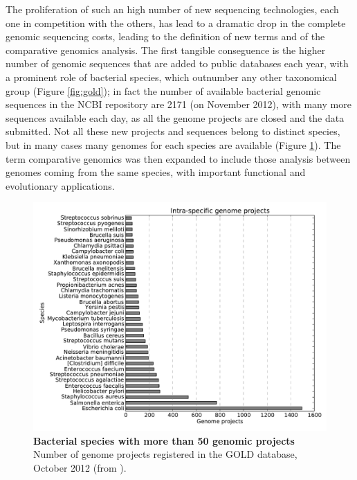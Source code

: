 The proliferation of such an high number of new sequencing technologies, each one in competition with the others, has lead to a dramatic drop in the complete genomic sequencing costs, leading to the definition of new terms and of the comparative genomics analysis. The first tangible conseguence is the higher number of genomic sequences that are added to public databases each year, with a prominent role of bacterial species, which outnumber any other taxonomical group (Figure \ref{fig:gold}); in fact the number of available bacterial genomic sequences in the NCBI repository are 2171 (on November 2012), with many more sequences available each day, as all the genome projects are closed and the data submitted. Not all these new projects and sequences belong to distinct species, but in many cases many genomes for each species are available (Figure \ref{fig:intraspecies}). The term comparative genomics was then expanded to include those analysis between genomes coming from the same species, with important functional and evolutionary applications.

\begin{figure}[!tb]
	\center
    \includegraphics[width=1\textwidth]{figures/Introduction/thesis_11}
	\caption{\label{fig:intraspecies}\textbf{Bacterial species with more than 50 genomic projects}\\
			Number of genome projects registered in the GOLD database, October 2012 (from \cite{gold}).}
\end{figure}

